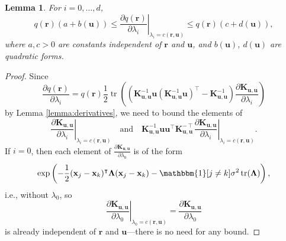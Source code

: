 \documentclass{article}
\newtheorem{lemma}[theorem]{Lemma}
\theoremstyle{definition}
\theoremstyle{remark}
\DeclareMathOperator{\tr}{tr}
\newcommand{\Kuu}{\mathbf{K}_{\mathbf{u},\mathbf{u}}}
\begin{document}
\begin{lemma} \label{lemma:bound1}
  For $i = 0, \dots, d$,
  \[
    q(\mathbf{r})(a + b(\mathbf{u})) \le \left. \frac{\partial
        q(\mathbf{r})}{\partial \lambda_i} \right|_{\lambda_i = c(\mathbf{r},
      \mathbf{u})} \le q(\mathbf{r})(c + d(\mathbf{u})),
  \]
  where $a, c > 0$ are constants independent of $\mathbf{r}$ and $\mathbf{u}$,
  and $b(\mathbf{u})$, $d(\mathbf{u})$ are quadratic forms.
\end{lemma}
\begin{proof}
  Since
  \[
    \frac{\partial q(\mathbf{r})}{\partial \lambda_i} =
    q(\mathbf{r})\frac{1}{2}\tr
    \left((\Kuu^{-1}\mathbf{u}(\Kuu^{-1}\mathbf{u})^\intercal - \Kuu^{-1})
      \frac{\partial \Kuu}{\partial \lambda_i}
    \right)
  \]
  by Lemma \ref{lemma:derivatives}, we need to bound the elements of
  \[
    \left. \frac{\partial \Kuu}{\partial \lambda_i}
      \right|_{\lambda_i = c(\mathbf{r}, \mathbf{u})} \quad \text{and} \quad
    \Kuu^{-1}\mathbf{u}\mathbf{u}^\intercal\Kuu^{-\intercal}
      \left. \frac{\partial \Kuu}{\partial \lambda_i} \right|_{\lambda_i =
        c(\mathbf{r}, \mathbf{u})}.
  \]
  If $i = 0$, then each element of $\frac{\partial
    \Kuu}{\partial \lambda_0}$ is of the form
  \[
    \exp \left( -\frac{1}{2}(\mathbf{x}_j - \mathbf{x}_k)^\intercal
      \bm\Lambda (\mathbf{x}_j - \mathbf{x}_k) - \mathbbm{1}[j \ne
      k]\sigma^2\tr(\bm\Lambda) \right),
  \]
  i.e., without $\lambda_0$, so
  \[
    \left. \frac{\partial \Kuu}{\partial \lambda_0} \right|_{\lambda_0 =
      c(\mathbf{r}, \mathbf{u})} = \frac{\partial \Kuu}{\partial \lambda_0}
  \]
  is already independent of $\mathbf{r}$ and $\mathbf{u}$---there is no need
  for any bound.


\end{proof}
\end{document}
